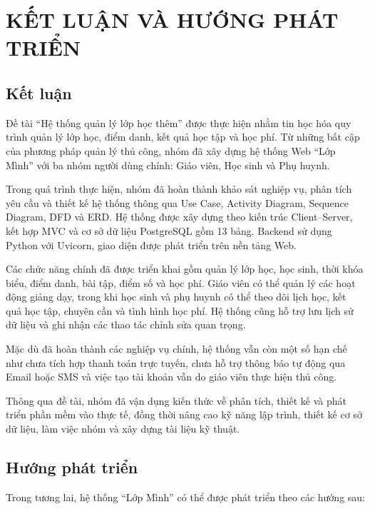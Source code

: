 \chapter*{KẾT LUẬN VÀ HƯỚNG PHÁT TRIỂN}

\section*{Kết luận}

Đề tài ``Hệ thống quản lý lớp học thêm'' được thực hiện nhằm tin học hóa quy trình quản lý lớp học, điểm danh, kết quả học tập và học phí. Từ những bất cập của phương pháp quản lý thủ công, nhóm đã xây dựng hệ thống Web ``Lớp Mình'' với ba nhóm người dùng chính: Giáo viên, Học sinh và Phụ huynh.

Trong quá trình thực hiện, nhóm đã hoàn thành khảo sát nghiệp vụ, phân tích yêu cầu và thiết kế hệ thống thông qua Use Case, Activity Diagram, Sequence Diagram, DFD và ERD. Hệ thống được xây dựng theo kiến trúc Client--Server, kết hợp MVC và cơ sở dữ liệu PostgreSQL gồm 13 bảng. Backend sử dụng Python với Uvicorn, giao diện được phát triển trên nền tảng Web.

Các chức năng chính đã được triển khai gồm quản lý lớp học, học sinh, thời khóa biểu, điểm danh, bài tập, điểm số và học phí. Giáo viên có thể quản lý các hoạt động giảng dạy, trong khi học sinh và phụ huynh có thể theo dõi lịch học, kết quả học tập, chuyên cần và tình hình học phí. Hệ thống cũng hỗ trợ lưu lịch sử dữ liệu và ghi nhận các thao tác chỉnh sửa quan trọng.

Mặc dù đã hoàn thành các nghiệp vụ chính, hệ thống vẫn còn một số hạn chế như chưa tích hợp thanh toán trực tuyến, chưa hỗ trợ thông báo tự động qua Email hoặc SMS và việc tạo tài khoản vẫn do giáo viên thực hiện thủ công.

Thông qua đề tài, nhóm đã vận dụng kiến thức về phân tích, thiết kế và phát triển phần mềm vào thực tế, đồng thời nâng cao kỹ năng lập trình, thiết kế cơ sở dữ liệu, làm việc nhóm và xây dựng tài liệu kỹ thuật.

\section*{Hướng phát triển}

Trong tương lai, hệ thống ``Lớp Mình'' có thể được phát triển theo các hướng sau:

